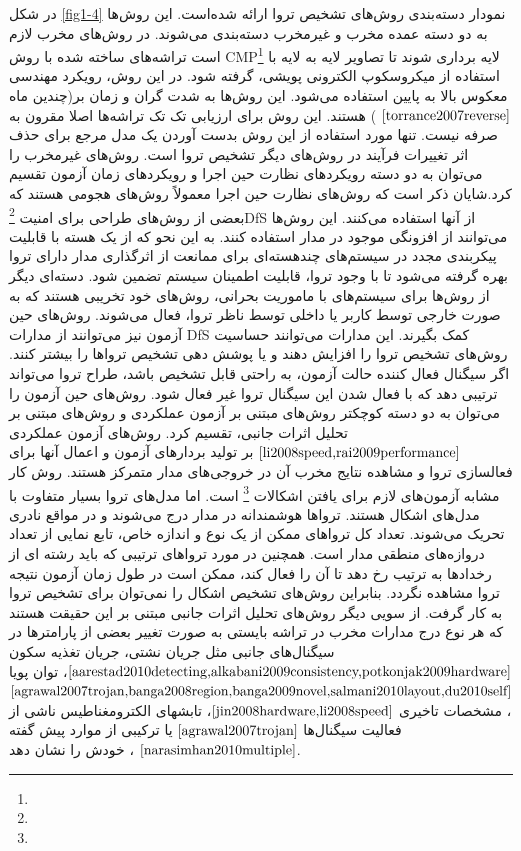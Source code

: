 در شکل \ref{fig1-4} نمودار دسته‌بندی روش‌های تشخیص تروا ارائه شده‌است. این روش‌ها به دو دسته عمده مخرب و غیرمخرب دسته‌بندی می‌شوند. در روش‌های مخرب لازم است تراشه‌های ساخته شده با روش CMP\footnote{} لایه برداری شوند تا تصاویر لایه به لایه با استفاده از میکروسکوپ الکترونی پویشی، گرفته شود. در این روش، رویکرد مهندسی معکوس بالا به پایین استفاده می‌شود. این روش‌ها به شدت گران و زمان بر(چندین ماه
$\cite{torrance2007reverse}$
) هستند. این روش برای ارزیابی تک تک تراشه‌ها اصلا مقرون به صرفه نیست. تنها مورد استفاده از این روش بدست آوردن یک مدل مرجع برای حذف اثر تغییرات فرآیند در روش‌های دیگر تشخیص تروا است. 
روش‌های غیرمخرب را می‌توان به دو دسته رویکردهای نظارت حین اجرا و رویکردهای زمان آزمون تقسیم کرد.شایان ذکر است که روش‌های نظارت حین اجرا معمولاً روش‌های هجومی هستند که بعضی از روش‌های طراحی برای امنیت \footnote{}DfS  از آنها استفاده می‌کنند. این روش‌ها می‌توانند از افزونگی موجود در مدار استفاده کنند. به این نحو که از یک هسته با قابلیت پیکربندی مجدد در سیستم‌های چندهسته‌ای برای ممانعت از اثرگذاری مدار دارای تروا بهره گرفته می‌شود تا با وجود تروا، قابلیت اطمینان سیستم تضمین شود. دسته‌ای دیگر از روش‌ها برای سیستم‌های با ماموریت بحرانی، روش‌های خود تخریبی هستند که به صورت خارجی توسط کاربر یا داخلی توسط ناظر تروا، فعال می‌شوند. 
روش‌های حین آزمون نیز می‌توانند از  مدارات DfS کمک بگیرند. این مدارات می‌توانند حساسیت روش‌های تشخیص تروا را افزایش دهند و یا پوشش دهی تشخیص تروا‌ها را بیشتر کنند. اگر سیگنال فعال کننده حالت آزمون، به راحتی قابل تشخیص باشد، طراح تروا می‌تواند ترتیبی دهد که با فعال شدن این سیگنال تروا غیر فعال شود. روش‌های حین آزمون را می‌توان به دو دسته کوچکتر روش‌های مبتنی بر آزمون عملکردی و روش‌های مبتنی بر تحلیل اثرات جانبی، تقسیم کرد.
روش‌های آزمون عملکردی 
$\cite{li2008speed,rai2009performance}$
بر تولید بردارهای آزمون و اعمال آنها برای فعالسازی تروا و مشاهده نتایج مخرب آن در خروجی‌های مدار متمرکز هستند. روش کار مشابه آزمون‌های لازم برای یافتن اشکالات \footnote{} است. اما مدل‌های تروا بسیار متفاوت با مدل‌های اشکال هستند. تروا‌ها هوشمندانه در مدار درج می‌شوند و در مواقع نادری تحریک می‌شوند. تعداد کل تروا‌های ممکن از یک نوع و اندازه خاص، تابع نمایی از تعداد دروازه‌های منطقی مدار است. همچنین در مورد تروا‌های ترتیبی که باید رشته ای از رخدادها به ترتیب رخ دهد تا آن را فعال کند، ممکن است در طول زمان آزمون نتیجه تروا مشاهده نگردد. بنابراین روش‌های تشخیص اشکال را نمی‌توان برای تشخیص تروا به کار گرفت.
از سویی دیگر روش‌های تحلیل اثرات جانبی مبتنی بر این حقیقت هستند که هر نوع درج مدارات مخرب در تراشه بایستی به صورت تغییر بعضی از پارامترها در سیگنال‌های جانبی مثل جریان نشتی، جریان تغذیه سکون $\cite{aarestad2010detecting,alkabani2009consistency,potkonjak2009hardware}$، توان پویا $\cite{agrawal2007trojan,banga2008region,banga2009novel,salmani2010layout,du2010self}$، مشخصات تاخیری $\cite{jin2008hardware,li2008speed}$، تابشهای الکترومغناطیس ناشی از فعالیت سیگنال‌ها $\cite{agrawal2007trojan}$ یا ترکیبی از موارد پیش گفته $\cite{narasimhan2010multiple}$ ، خودش را نشان دهد.
